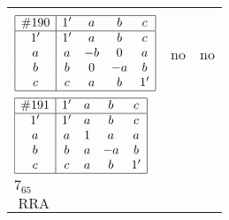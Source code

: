 \documentclass[12pt]{article}
\newcommand\RRA{\operatorname{RRA}}
\newcommand{\id}{{1'}}%
\renewcommand{\top}{1}%
\begin{document}
\begin{center}
\begin{longtable}{l|c|c}
{\begin{tikzpicture}[<->,shorten <=1pt,shorten >=1pt,label distance=0mm, font=\small]
\end{tikzpicture}
}      \\[15mm]

$
\begin{array}{|c|cccc|} \hline
\#190 & \id & a & b & c \\ \hline
\id & \id & a & b & c \\
a & a & -b & 0 & a \\
b & b & 0 & -a & b \\
c & c & a & b & \id \\ \hline
\end{array}
$
 & no  
 & no      \\[15mm]

$
\begin{array}{|c|cccc|} \hline
\#191 & \id & a & b & c \\ \hline
\id & \id & a & b & c \\
a & a & \top & a & a \\
b & b & a & -a & b \\
c & c & a & b & \id \\ \hline
\end{array}
$
 & \begin{tabular}{c} yes \\ $7_{65}$ \\ $\RRA$ \end{tabular} 
 & \adjustbox{valign=c, max height=1.6cm}{$
\left[ \begin{array}{cccccc}
\id & a & a & b & c & b \\ 
a & \id & a & a & a & a \\ 
a & a & \id & a & a & a \\ 
b & a & a & \id & b & b \\ 
c & a & a & b & \id & b \\ 
b & a & a & b & b & \id
\end{array}\right]
$}      \\[15mm]


\end{longtable}
\end{center}
\end{document}
